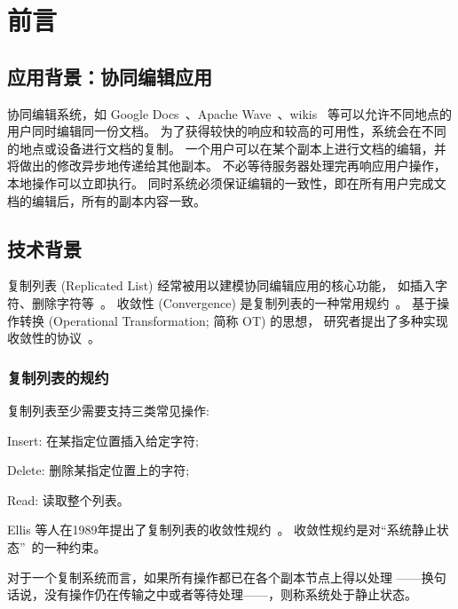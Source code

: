 \chapter{前言}
\section{应用背景：协同编辑应用}

协同编辑系统，如 Google Docs~\cite{GoogleDocs}、Apache Wave~\cite{Wave}、wikis~\cite{Leuf:Wiki01} 
等可以允许不同地点的用户同时编辑同一份文档。
为了获得较快的响应和较高的可用性，系统会在不同的地点或设备进行文档的复制。
一个用户可以在某个副本上进行文档的编辑，并将做出的修改异步地传递给其他副本。
不必等待服务器处理完再响应用户操作，本地操作可以立即执行。
同时系统必须保证编辑的一致性，即在所有用户完成文档的编辑后，所有的副本内容一致。

\section{技术背景}

复制列表 (Replicated List) 经常被用以建模协同编辑应用的核心功能，
如插入字符、删除字符等~\cite{Ellis:SIGMOD89, Nichols:UIST95, Attiya:PODC16}。
收敛性 (Convergence) 是复制列表的一种常用规约~\cite{Ellis:SIGMOD89}。
基于操作转换 (Operational Transformation; 简称 OT) 的思想，
研究者提出了多种实现收敛性的协议~\cite{Ellis:SIGMOD89, Prakash:TOCHI94, Nichols:UIST95, Sun:TOCHI98, Sun:CSCW98, 
Vidot:CSCW00, Shen:CSCW02, Sun:TOCHI02, Li:ICPADS04, Sun:TPDS09, Sun:CSCW14}。

\subsection{复制列表的规约}
复制列表至少需要支持三类常见操作: 
\begin{inparaenum}[(1)]
  \item Insert: 在某指定位置插入给定字符;
  \item Delete: 删除某指定位置上的字符;
  \item Read: 读取整个列表。
\end{inparaenum}

Ellis 等人在1989年提出了复制列表的收敛性规约~\cite{Ellis:SIGMOD89}。
收敛性规约是对``系统静止状态''~\cite{Ellis:SIGMOD89}的一种约束。
\begin{definition}
  对于一个复制系统而言，如果所有操作都已在各个副本节点上得以处理
  ——换句话说，没有操作仍在传输之中或者等待处理——，则称系统处于静止状态。
\end{definition}

